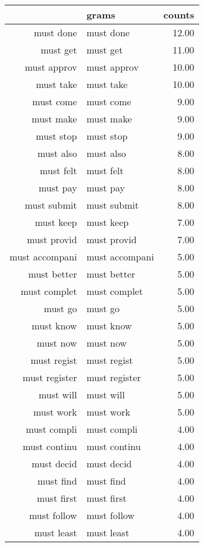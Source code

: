 \begin{table}[ht]
\centering
\begin{tabular}{rlr}
  \hline
 & grams & counts \\ 
  \hline
must done & must done & 12.00 \\ 
  must get & must get & 11.00 \\ 
  must approv & must approv & 10.00 \\ 
  must take & must take & 10.00 \\ 
  must come & must come & 9.00 \\ 
  must make & must make & 9.00 \\ 
  must stop & must stop & 9.00 \\ 
  must also & must also & 8.00 \\ 
  must felt & must felt & 8.00 \\ 
  must pay & must pay & 8.00 \\ 
  must submit & must submit & 8.00 \\ 
  must keep & must keep & 7.00 \\ 
  must provid & must provid & 7.00 \\ 
  must accompani & must accompani & 5.00 \\ 
  must better & must better & 5.00 \\ 
  must complet & must complet & 5.00 \\ 
  must go & must go & 5.00 \\ 
  must know & must know & 5.00 \\ 
  must now & must now & 5.00 \\ 
  must regist & must regist & 5.00 \\ 
  must register & must register & 5.00 \\ 
  must will & must will & 5.00 \\ 
  must work & must work & 5.00 \\ 
  must compli & must compli & 4.00 \\ 
  must continu & must continu & 4.00 \\ 
  must decid & must decid & 4.00 \\ 
  must find & must find & 4.00 \\ 
  must first & must first & 4.00 \\ 
  must follow & must follow & 4.00 \\ 
  must least & must least & 4.00 \\ 

\end{tabular}
\end{table}
